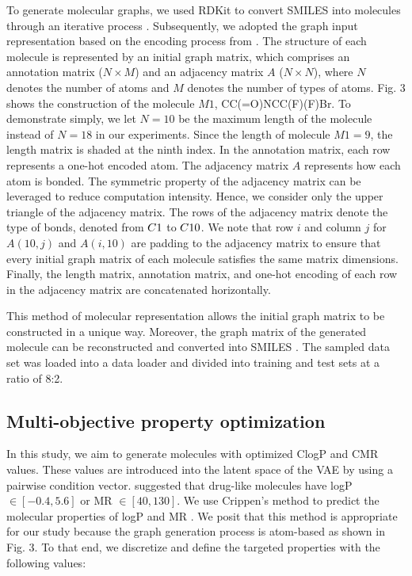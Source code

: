 To generate molecular graphs, we used RDKit to convert SMILES into molecules through an iterative process \cite{landrum2013rdkit}. Subsequently, we adopted the graph input representation based on the encoding process from \cite{lee2022mgcvae}. The structure of each molecule is represented by an initial graph matrix, which comprises an annotation matrix ($N\times M$) and an adjacency matrix $A$ ($N\times N$), where $N$ denotes the number of atoms and $M$ denotes the number of types of atoms. Fig. 3 shows the construction of the molecule $M1$, CC(=O)NCC(F)(F)Br. To demonstrate simply, we let $N = 10$ be the maximum length of the molecule instead of $N = 18$ in our experiments. Since the length of molecule $M1 = 9$, the length matrix is shaded at the ninth index. In the annotation matrix, each row represents a one-hot encoded atom. The adjacency matrix $A$ represents how each atom is bonded. The symmetric property of the adjacency matrix can be leveraged to reduce computation intensity. Hence, we consider only the upper triangle of the adjacency matrix. The rows of the adjacency matrix denote the type of bonds, denoted from $C\-1$ to $C\-10$. We note that row $i$ and column $j$ for $A(10,j)$ and $A(i,10)$ are padding to the adjacency matrix to ensure that every initial graph matrix of each molecule satisfies the same matrix dimensions. Finally, the length matrix, annotation matrix, and one-hot encoding of each row in the adjacency matrix are concatenated horizontally.  

This method of molecular representation allows the initial graph matrix to be constructed in a unique way. Moreover, the graph matrix of the generated molecule can be reconstructed and converted into SMILES \cite{lee2022mgcvae}. The sampled data set was loaded into a data loader and divided into training and test sets at a ratio of 8:2. 

\subsection{Multi-objective property optimization}
In this study, we aim to generate molecules with optimized ClogP and CMR values. These values are introduced into the latent space of the VAE by using a pairwise condition vector. \cite{ghose1999knowledge} suggested that drug-like molecules have logP $\in [-0.4, 5.6]$ or MR $\in [40, 130]$. We use Crippen's method to predict the molecular properties of logP and MR \cite{wildman1999prediction}. We posit that this method is appropriate for our study because the graph generation process is atom-based as shown in Fig. 3. To that end, we discretize and define the targeted properties with the following values:

